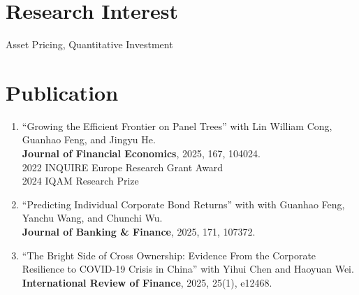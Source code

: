 \documentclass{clean_cv}
\begin{document}
\section{Research Interest}
\begin{center}
	Asset Pricing, Quantitative Investment
\end{center}

\section{Publication}

\begin{enumerate}
	\setlength\itemsep{1.0em}
	

	\item “Growing the Efficient Frontier on Panel Trees” 
		with Lin William Cong, Guanhao Feng, and Jingyu He. 
		\href{https://doi.org/10.1016/j.jfineco.2025.104024}{ \color{orange} }	\\
		\textbf{Journal of Financial Economics}, 2025, 167, 104024. \\
		2022 INQUIRE Europe Research Grant Award \\
		2024 IQAM Research Prize
		
	\item “Predicting Individual Corporate Bond Returns” 
		with with Guanhao Feng, Yanchu Wang, and Chunchi Wu. 
		\href{https://papers.ssrn.com/sol3/papers.cfm?abstract_id=3870306}{ \color{orange} } \\
		\textbf{Journal of Banking \& Finance}, 2025, 171, 107372.
			
	\item “The Bright Side of Cross Ownership: Evidence From the Corporate Resilience to COVID-19 Crisis in China” 
		with Yihui Chen and Haoyuan Wei. 
		\href{https://papers.ssrn.com/sol3/papers.cfm?abstract_id=5110785}{ \color{orange} } \\
		\textbf{International Review of Finance}, 2025, 25(1), e12468.
	
\end{enumerate}
\end{document}
